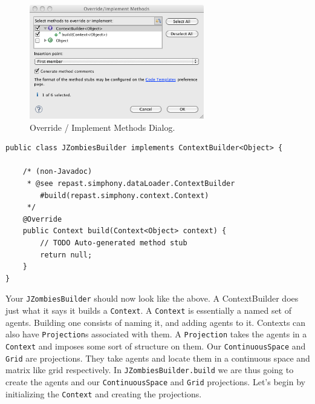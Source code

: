 \documentclass[11pt]{amsart}
\begin{document}
\begin{figure}[h]
\begin{center}
\vspace{.2in}
\centerline {
\includegraphics[width=3in]{GettingStartedImages/imp_methods.png}
}
\caption{Override / Implement Methods Dialog.}
\label{fig:imp}
\end{center}
\end{figure}

\noindent\begin{minipage}[h]{\textwidth}
\vspace{.2in}
\lstset{language=java,caption=Skeleton JZombiesBuilder}
\begin{lstlisting}
public class JZombiesBuilder implements ContextBuilder<Object> {

	/* (non-Javadoc)
	 * @see repast.simphony.dataLoader.ContextBuilder
	 	#build(repast.simphony.context.Context)
	 */
	@Override
	public Context build(Context<Object> context) {
		// TODO Auto-generated method stub
		return null;
	}
}
\end{lstlisting}
\vspace{.2in}
\end{minipage}

Your \texttt{JZombiesBuilder} should now look like the above. A ContextBuilder does just what it says it builds a \texttt{Context}. A \texttt{Context} is essentially a named set of agents. Building one consists of naming it, and adding agents to it. Contexts can also have \texttt{Projection}s associated with them. A \texttt{Projection} takes the agents in a \texttt{Context} and imposes some sort of structure on them. Our  \texttt{ContinuousSpace} and \texttt{Grid} are projections. They take agents and locate them in a continuous space and matrix like grid respectively. In \texttt{JZombiesBuilder.build} we are thus going to create the agents and our  \texttt{ContinuousSpace} and \texttt{Grid} projections. Let's begin by initializing the \texttt{Context} and creating the projections.
\end{document}
